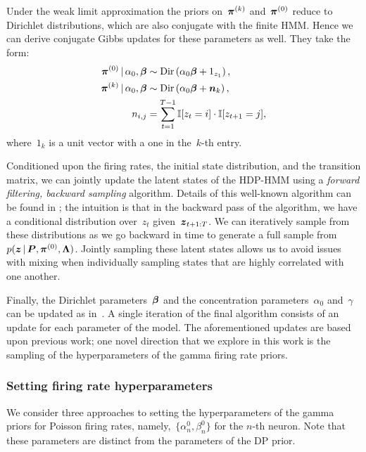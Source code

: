 Under the weak limit approximation the priors on~$\boldsymbol{\pi}^{(k)}$
and~$\boldsymbol{\pi}^{(0)}$ reduce to Dirichlet distributions, which are also conjugate
with the finite HMM. Hence we can derive conjugate Gibbs updates for
these parameters as well. They take the form:
\begin{align}
\boldsymbol{\pi}^{(0)} \,|\, \alpha_0, \boldsymbol{\beta} &\sim \mathrm{Dir}\left(\alpha_0\boldsymbol{\beta} + 1_{z_1}\right),\\
\nonumber \boldsymbol{\pi}^{(k)} \,|\, \alpha_0, \boldsymbol{\beta} &\sim \mathrm{Dir}\left(\alpha_0\boldsymbol{\beta} + \boldsymbol{n}_{k}\right),\\
\nonumber n_{i,j}&=\sum_{t=1}^{T-1} \mathbb{I}[z_t=i] \cdot \mathbb{I}[z_{t+1}=j],
\end{align}
where~$1_k$ is a unit vector with a one in the~$k$-th entry.

Conditioned upon the firing rates, the initial state distribution, and
the transition matrix, we can jointly update the latent states of the
HDP-HMM using a {\em forward filtering, backward sampling}
algorithm. Details of this well-known algorithm can be found in
\citep{Johnson14b}; the intuition is that in the backward pass of the
algorithm, we have a conditional distribution over~$z_t$
given~$\boldsymbol{z}_{t+1:T}$. We can iteratively sample from these distributions
as we go backward in time to generate a full sample
from~${p(\boldsymbol{z} \,|\, \boldsymbol{P}, \boldsymbol{\pi}^{(0)}, \boldsymbol{\Lambda})}$. Jointly sampling
these latent states allows us to avoid issues with mixing when
individually sampling states that are highly correlated with one
another.

Finally, the Dirichlet parameters~$\boldsymbol{\beta}$ and the concentration
parameters~$\alpha_0$ and~$\gamma$ can be updated as
in~\citep{Teh06}. A single iteration of the final algorithm consists
of an update for each parameter of the model. The aforementioned
updates are based upon previous work; one novel direction that we
explore in this work is the sampling of the hyperparameters of the
gamma firing rate priors.

\subsubsection{Setting firing rate hyperparameters} 
\label{sec:fr_hypers}
We consider three approaches to setting the hyperparameters of the
gamma priors for Poisson firing rates, namely,~${\{\alpha_n^0,
  \beta_n^0\}}$ for the $n$-th neuron.  Note that these parameters are
distinct from the parameters of the DP prior.


